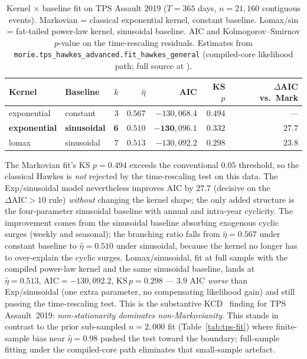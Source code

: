 \documentclass[article,shortnames,nojss]{jss}
\newcommand{\1}{\mathbbm{1}}
\theoremstyle{plain}
\theoremstyle{definition}
\begin{document}
\begin{table}[h]
\centering\footnotesize
\caption{Kernel $\times$ baseline fit on TPS Assault 2019
($T=365$ days, $n=21{,}160$ contiguous events).  Markovian =
classical exponential kernel, constant baseline.  Lomax/sin =
fat-tailed power-law kernel, sinusoidal baseline.  AIC and
Kolmogorov--Smirnov $p$-value on the time-rescaling residuals.
Estimates from \texttt{morie.tps\_hawkes\_advanced.fit\_hawkes\_general}
(compiled-core likelihood path; full source at
).}
\label{tab:tps-fit-2019}
\begin{tabular}{llrrrrr}
\toprule
Kernel & Baseline & $k$ & $\hat\eta$ & AIC & KS $p$ & $\Delta$AIC vs.\ Mark\\\midrule
exponential & constant   & $3$ & $0.567$ & $-130{,}068.4$ & $0.494$ & ---\\
\textbf{exponential} & \textbf{sinusoidal} & $\mathbf{6}$ & $\mathbf{0.510}$ & $\mathbf{-130{,}096.1}$ & $\mathbf{0.332}$ & $\mathbf{27.7}$\\
lomax        & sinusoidal & $7$ & $0.513$ & $-130{,}092.2$ & $0.298$ & $23.8$\\
\bottomrule
\end{tabular}
\end{table}

The Markovian fit's KS $p=0.494$ exceeds the conventional $0.05$
threshold, so the classical Hawkes is \emph{not} rejected by the
time-rescaling test on this data.  The Exp/sinusoidal model
nevertheless improves AIC by $27.7$ (decisive on the
\citet{BurnhamAnderson2002} $\Delta\mathrm{AIC} > 10$ rule)
\emph{without} changing the kernel shape; the only added
structure is the four-parameter sinusoidal baseline with annual
and intra-year cyclicity.  The improvement comes from the
sinusoidal baseline absorbing exogenous cyclic surges (weekly
and seasonal); the branching ratio falls from $\hat\eta=0.567$
under constant baseline to $\hat\eta=0.510$ under sinusoidal,
because the kernel no longer has to over-explain the cyclic
surges.  Lomax/sinusoidal, fit at full sample with the compiled
power-law kernel and the same sinusoidal baseline, lands at
$\hat\eta=0.513,\,\text{AIC}=-130{,}092.2,\,\text{KS}\,p=0.298$
--- $3.9$ AIC \emph{worse} than Exp/sinusoidal (one extra
parameter, no compensating likelihood gain) and still passing
the time-rescaling test.  This is the substantive
KCD~\citep{kwan2025nonstationary} finding for TPS Assault~2019:
\emph{non-stationarity dominates non-Markovianity}.  This
stands in contrast to the prior sub-sampled $n=2{,}000$ fit
(Table~\ref{tab:tps-fit}) where finite-sample bias near
$\hat\eta=0.98$ pushed the test toward the boundary; full-sample
fitting under the compiled-core path eliminates that small-sample
artefact.
\end{document}
